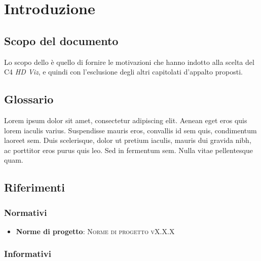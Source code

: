\documentclass{article}
\begin{document}


\section{Introduzione}%
\label{sec:introduzione}

\subsection{Scopo del documento}%
\label{sub:scopo_del_documento}
Lo scopo dello \textsc{\placeholderTitle} è quello di fornire le motivazioni che hanno indotto alla scelta del  C4 \emph{HD Viz}, e quindi con l'esclusione degli altri capitolati d'appalto proposti.

\subsection{Glossario}%
\label{sub:glossario}
Lorem ipsum dolor sit amet, consectetur adipiscing elit. Aenean eget eros quis lorem iaculis varius. Suspendisse mauris eros, convallis id sem quis, condimentum laoreet sem. Duis scelerisque, dolor ut pretium iaculis, mauris dui gravida nibh, ac porttitor eros purus quis leo. Sed in fermentum sem. Nulla vitae pellentesque quam.

\subsection{Riferimenti}%
\label{sub:riferimenti}

\subsubsection{Normativi}%
\label{subs:normativi}

\begin{itemize}
  \item \textbf{Norme di progetto}: \textsc{Norme di progetto vX.X.X}
\end{itemize}

\subsubsection{Informativi}%
\label{subs:informativi}
\end{document}
